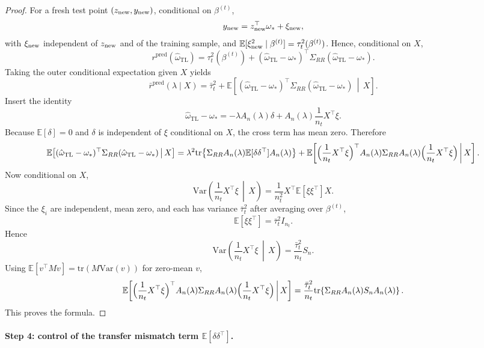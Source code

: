 \documentclass[11pt]{article}
\newcommand{\1}{\mathbf{1}}
\begin{document}
\begin{proof}
For a fresh test point \((z_{\rm new},y_{\rm new})\), conditional on \(\beta^{(t)}\),
\[
y_{\rm new}=z_{\rm new}^\top\omega_*+\xi_{\rm new},
\]
with \(\xi_{\rm new}\) independent of \(z_{\rm new}\) and of the training sample, and
\(\mathbb E[\xi_{\rm new}^2\mid\beta^{(t)}]=\tau_t^2(\beta^{(t)})\).
Hence, conditional on \(X\),
\[
r^{\mathrm{pred}}(\hat\omega_{\mathrm{TL}})
=
\tau_t^2(\beta^{(t)})
+
(\hat\omega_{\mathrm{TL}}-\omega_*)^\top
\Sigma_{RR}
(\hat\omega_{\mathrm{TL}}-\omega_*).
\]
Taking the outer conditional expectation given \(X\) yields
\[
\bar r^{\mathrm{pred}}(\lambda\mid X)
=
\bar\tau_t^2
+
\mathbb E\!\left[
(\hat\omega_{\mathrm{TL}}-\omega_*)^\top
\Sigma_{RR}
(\hat\omega_{\mathrm{TL}}-\omega_*)
\,\middle|\,X
\right].
\]
Insert the identity
\[
\hat\omega_{\mathrm{TL}}-\omega_*
=
-\lambda A_n(\lambda)\delta
+
A_n(\lambda)\frac1{n_t}X^\top\xi.
\]
Because \(\mathbb E[\delta]=0\) and \(\delta\) is independent of \(\xi\) conditional on \(X\),
the cross term has mean zero. Therefore
\[
\mathbb E\!\left[
(\hat\omega_{\mathrm{TL}}-\omega_*)^\top
\Sigma_{RR}
(\hat\omega_{\mathrm{TL}}-\omega_*)
\,\middle|\,X
\right]
=
\lambda^2\mathrm{tr}\!\left\{
\Sigma_{RR}A_n(\lambda)\mathbb E[\delta\delta^\top]A_n(\lambda)
\right\}
+
\mathbb E\!\left[
\Bigl(\frac1{n_t}X^\top\xi\Bigr)^\top
A_n(\lambda)\Sigma_{RR}A_n(\lambda)
\Bigl(\frac1{n_t}X^\top\xi\Bigr)
\,\middle|\,X
\right].
\]
Now conditional on \(X\),
\[
\mathrm{Var}\!\left(\frac1{n_t}X^\top\xi\,\middle|\,X\right)
=
\frac1{n_t^2}X^\top\mathbb E[\xi\xi^\top]X.
\]
Since the \(\xi_i\) are independent, mean zero, and each has variance
\(\bar\tau_t^2\) after averaging over \(\beta^{(t)}\),
\[
\mathbb E[\xi\xi^\top]=\bar\tau_t^2 I_{n_t}.
\]
Hence
\[
\mathrm{Var}\!\left(\frac1{n_t}X^\top\xi\,\middle|\,X\right)
=
\frac{\bar\tau_t^2}{n_t}S_n.
\]
Using \(\mathbb E[v^\top Mv]=\mathrm{tr}(M\mathrm{Var}(v))\) for zero-mean \(v\),
\[
\mathbb E\!\left[
\Bigl(\frac1{n_t}X^\top\xi\Bigr)^\top
A_n(\lambda)\Sigma_{RR}A_n(\lambda)
\Bigl(\frac1{n_t}X^\top\xi\Bigr)
\,\middle|\,X
\right]
=
\frac{\bar\tau_t^2}{n_t}
\mathrm{tr}\!\left\{
\Sigma_{RR}A_n(\lambda)S_nA_n(\lambda)
\right\}.
\]
This proves the formula.
\end{proof}

\bigskip

\paragraph{Step 4: control of the transfer mismatch term \(\mathbb E[\delta\delta^\top]\).}
\end{document}
